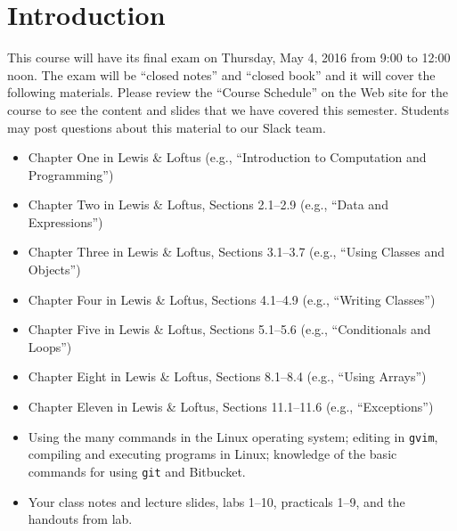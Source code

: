 


\vspace*{-.15in}

\section*{Introduction}

This course will have its final exam on Thursday, May 4, 2016 from 9:00 to 12:00 noon. The exam will be ``closed
notes'' and ``closed book'' and it will cover the following materials. Please review the ``Course Schedule'' on the Web
site for the course to see the content and slides that we have covered this semester. Students may post questions about
this material to our Slack team.

\begin{itemize}

  \itemsep 0in

  \item Chapter One in Lewis \& Loftus (e.g., ``Introduction to Computation and Programming'')

  \item Chapter Two in Lewis \& Loftus, Sections 2.1--2.9 (e.g., ``Data and Expressions'')

  \item Chapter Three in Lewis \& Loftus, Sections 3.1--3.7 (e.g., ``Using Classes and Objects'')

  \item Chapter Four in Lewis \& Loftus, Sections 4.1--4.9 (e.g., ``Writing Classes'')

  \item Chapter Five in Lewis \& Loftus, Sections 5.1--5.6 (e.g., ``Conditionals and Loops'')

  \item Chapter Eight in Lewis \& Loftus, Sections 8.1--8.4 (e.g., ``Using Arrays'')

  \item Chapter Eleven in Lewis \& Loftus, Sections 11.1--11.6 (e.g., ``Exceptions'')


  \item Using the many commands in the Linux operating system; editing in {\tt gvim}, compiling and executing
    programs in Linux; knowledge of the basic commands for using {\tt git} and Bitbucket.

  \item Your class notes and lecture slides, labs 1--10, practicals 1--9, and the handouts from lab.

\end{itemize}

